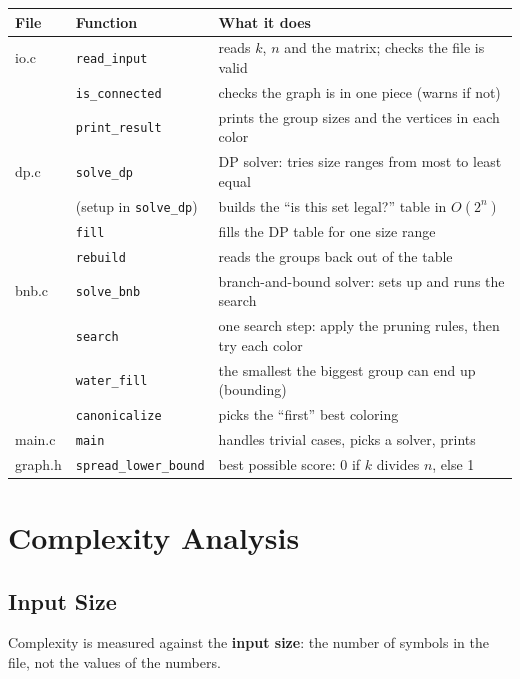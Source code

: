 \documentclass[11pt]{article}
\begin{document}
\begin{tabular}{@{}lll@{}}
\toprule
File & Function & What it does \\
\midrule
io.c   & \texttt{read\_input}    & reads $k$, $n$ and the matrix; checks the file is valid \\
       & \texttt{is\_connected}  & checks the graph is in one piece (warns if not) \\
       & \texttt{print\_result}  & prints the group sizes and the vertices in each color \\
dp.c   & \texttt{solve\_dp}      & DP solver: tries size ranges from most to least equal \\
       & (setup in \texttt{solve\_dp}) & builds the ``is this set legal?'' table in $O(2^n)$ \\
       & \texttt{fill}           & fills the DP table for one size range \\
       & \texttt{rebuild}        & reads the groups back out of the table \\
bnb.c  & \texttt{solve\_bnb}     & branch-and-bound solver: sets up and runs the search \\
       & \texttt{search}         & one search step: apply the pruning rules, then try each color \\
       & \texttt{water\_fill}    & the smallest the biggest group can end up (bounding) \\
       & \texttt{canonicalize}   & picks the ``first'' best coloring \\
main.c & \texttt{main}           & handles trivial cases, picks a solver, prints \\
graph.h & \texttt{spread\_lower\_bound} & best possible score: 0 if $k$ divides $n$, else 1 \\
\bottomrule
\end{tabular}

\section{Complexity Analysis}\label{sec:complexity}

\subsection{Input Size}

Complexity is measured against the \textbf{input size}: the number of
symbols in the file, not the values of the numbers.
\end{document}
